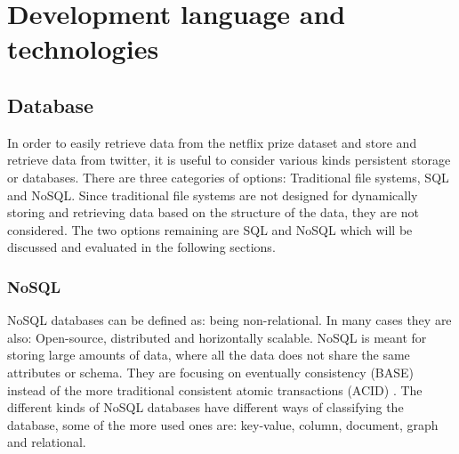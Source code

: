\section{Development language and technologies}

\subsection{Database}
In order to easily retrieve data from the netflix prize dataset and store and retrieve data from twitter, it is useful to consider various kinds persistent storage or databases. There are three categories of options: Traditional file systems, SQL and NoSQL. Since traditional file systems are not designed for dynamically storing and retrieving data based on the structure of the data, they are not considered. The two options remaining are SQL and NoSQL which will be discussed and evaluated in the following sections.

\subsubsection*{NoSQL}
NoSQL databases can be defined as: being non-relational. In many cases they are also: Open-source, distributed and horizontally scalable\cite{nosql}. NoSQL is meant for storing large amounts of data\cite{bigdata}, where all the data does not share the same attributes or schema. They are focusing on eventually consistency (BASE) instead of the more traditional consistent atomic transactions (ACID) \cite{pritchett}. The different kinds of NoSQL databases have different ways of classifying the database, some of the more used ones are: key-value, column, document, graph and relational.

